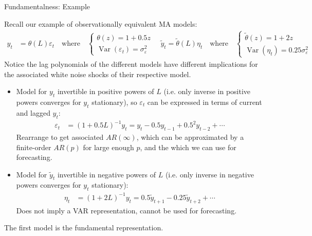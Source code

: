 \documentclass[aspectratio=169, handout]{beamer}
\newcommand{\Var}{\operatorname{Var}}
\begin{document}
{\scriptsize
\begin{frame}{Fundamentalness: Example}

Recall our example of observationally equivalent MA models:
\begin{align*}
  y_t &= \theta(L)\varepsilon_t
  \quad\text{where}\quad
  \begin{cases}
    \theta(z) = 1+0.5z \\
    \Var(\varepsilon_t) = \sigma^2_\varepsilon
  \end{cases}
  \quad
  \tilde{y}_t = \tilde{\theta}(L)\eta_t
  \quad\text{where}\quad
  \begin{cases}
    \tilde{\theta}(z) = 1+2z \\
    \Var(\eta_t) = 0.25 \sigma^2_\varepsilon
  \end{cases}
\end{align*}
Notice the lag polynomials of the different models have different
implications for the associated white noise shocks of their respective
model.
\pause
\begin{itemize}
  \item Model for $y_t$ invertible in \alert{positive} powers of $L$
    (i.e. only inverse in positive powers converges for $y_t$
    stationary),
    so $\varepsilon_t$ can be expressed in terms of
    \alert{current and lagged} $y_t$:
    \begin{align*}
      \varepsilon_t
      &=
      (1+0.5L)^{-1}y_t
      =
      y_t-0.5 y_{t-1} + 0.5^2 y_{t-2} + \cdots
    \end{align*}
    Rearrange to get associated $AR(\infty)$,
    which can be approximated by a finite-order $AR(p)$ for large enough
    $p$, and the which we can use for forecasting.


  \pause
  \item Model for $\tilde{y}_t$ invertible in \alert{negative} powers of
    $L$ (i.e. only inverse in negative powers converges for $y_t$
    stationary):
    \begin{align*}
      \eta_t
      &=
      (1+2L)^{-1}y_t
      =
      0.5 \tilde{y}_{t+1} - 0.25 \tilde{y}_{t+2} + \cdots
    \end{align*}
    Does not imply a VAR representation, cannot be used for forecasting.

\end{itemize}
\pause
The first model is the \alert{fundamental representation}.
\end{frame}
}
\end{document}
